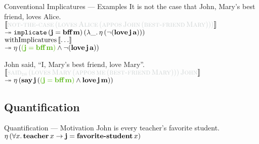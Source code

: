 \documentclass{beamer}
\begin{document}
\begin{frame}{Conventional Implicatures --- Examples}
  It is not the case that John, Mary's best friend, loves Alice. \\
  $\sem{\textcolor{shady}{\ap{\abs{not-the-case}}{(\app{\abs{loves}}{\abs{Alice}}{(\app{\abs{appos}}{\abs{John}}{(\ap{\abs{best-friend}}{\abs{Mary}})})})}}}$ \\
  \hfill $\twoheadrightarrow \mathtt{implicate}\,(\textbf{j} = \textbf{bff}\,\textbf{m})\,(\lambda \_.\, \eta\,(\lnot (\textbf{love}\,\textbf{j}\,\textbf{a})))$ \\
  \pause
  $\operatorname{withImplicatures}\,\llbracket \ldots \rrbracket$ \\
  \hfill $\tto \etaE{(\textcolor{cicolor}{(\obj{j} = \ap{\obj{bff}}{\obj{m}})} \land \lnot (\app{\obj{love}}{\obj{j}}{\obj{a}}))}$

  \pause
  \vfill

  John said, ``I, Mary's best friend, love Mary''. \\
  $\sem{\textcolor{shady}{\app{\abs{said}_{\abs{ds}}}{(\app{\abs{loves}}{\abs{Mary}}{(\app{\abs{appos}}{\abs{me}}{(\ap{\abs{best-friend}}{\abs{Mary}})})})}{\abs{John}}}}$ \\
  \hfill $\tto \etaE{(\app{\obj{say}}{\obj{j}}{(\textcolor{cicolor}{(\obj{j} = \ap{\obj{bff}}{\obj{m}})} \land \app{\obj{love}}{\obj{j}}{\obj{m}})})}$
\end{frame}


\subsection{Quantification}

\begin{frame}{Quantification --- Motivation}
  John is every teacher's favorite student. \\
  $\eta\,(\forall x.\, \textbf{teacher}\,x \to \textbf{j} = \textbf{favorite-student}\,x)$
\end{frame}
\end{document}
